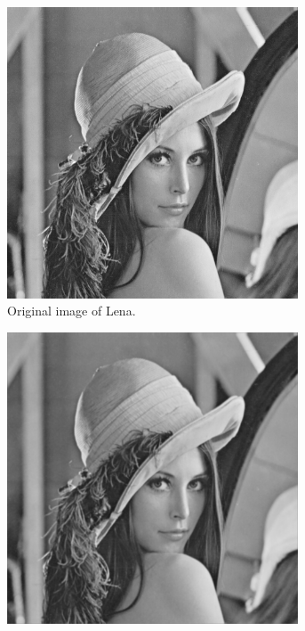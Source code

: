 \documentclass{article}
\theoremstyle{problemstyle}
\begin{document}
\begin{problem}
\begin{enumerate}[a)]
\begin{enumerate}[i)]
		            \begin{figure}[H]
			            \begin{subfigure}{.45\textwidth}
				            \centering
				            \includegraphics[width=0.95\textwidth]{lena_ascii.png}
				            \caption{Original image of Lena.}
			            \end{subfigure}
			            \hfill
			            \begin{subfigure}{.45\textwidth}
				            \centering
				            \includegraphics[width=0.95\textwidth]{lena_gaussian_3x3.png}

\end{subfigure}
\end{figure}
\end{enumerate}
\end{enumerate}
\end{problem}
\end{document}
